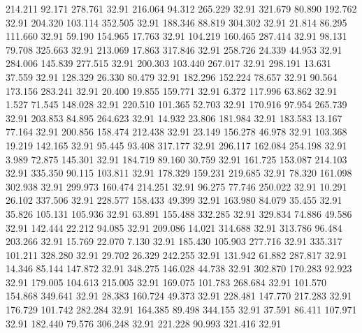  214.211   92.171  278.761        32.91
 216.064   94.312  265.229        32.91
 321.679   80.890  192.762        32.91
 204.320  103.114  352.505        32.91
 188.346   88.819  304.302        32.91
  21.814   86.295  111.660        32.91
  59.190  154.965   17.763        32.91
 104.219  160.465  287.414        32.91
  98.131   79.708  325.663        32.91
 213.069   17.863  317.846        32.91
 258.726   24.339   44.953        32.91
 284.006  145.839  277.515        32.91
 200.303  103.440  267.017        32.91
 298.191   13.631   37.559        32.91
 128.329   26.330   80.479        32.91
 182.296  152.224   78.657        32.91
  90.564  173.156  283.241        32.91
  20.400   19.855  159.771        32.91
   6.372  117.996   63.862        32.91
   1.527   71.545  148.028        32.91
 220.510  101.365   52.703        32.91
 170.916   97.954  265.739        32.91
 203.853   84.895  264.623        32.91
  14.932   23.806  181.984        32.91
 183.583   13.167   77.164        32.91
 200.856  158.474  212.438        32.91
  23.149  156.278   46.978        32.91
 103.368   19.219  142.165        32.91
  95.445   93.408  317.177        32.91
 296.117  162.084  254.198        32.91
   3.989   72.875  145.301        32.91
 184.719   89.160   30.759        32.91
 161.725  153.087  214.103        32.91
 335.350   90.115  103.811        32.91
 178.329  159.231  219.685        32.91
  78.320  161.098  302.938        32.91
 299.973  160.474  214.251        32.91
  96.275   77.746  250.022        32.91
  10.291   26.102  337.506        32.91
 228.577  158.433   49.399        32.91
 163.980   84.079   35.455        32.91
  35.826  105.131  105.936        32.91
  63.891  155.488  332.285        32.91
 329.834   74.886   49.586        32.91
 142.444   22.212   94.085        32.91
 209.086   14.021  314.688        32.91
 313.786   96.484  203.266        32.91
  15.769   22.070    7.130        32.91
 185.430  105.903  277.716        32.91
 335.317  101.211  328.280        32.91
  29.702   26.329  242.255        32.91
 131.942   61.882  287.817        32.91
  14.346   85.144  147.872        32.91
 348.275  146.028   44.738        32.91
 302.870  170.283   92.923        32.91
 179.005  104.613  215.005        32.91
 169.075  101.783  268.684        32.91
 101.570  154.868  349.641        32.91
  28.383  160.724   49.373        32.91
 228.481  147.770  217.283        32.91
 176.729  101.742  282.284        32.91
 164.385   89.498  344.155        32.91
  37.591   86.411  107.971        32.91
 182.440   79.576  306.248        32.91
 221.228   90.993  321.416        32.91
